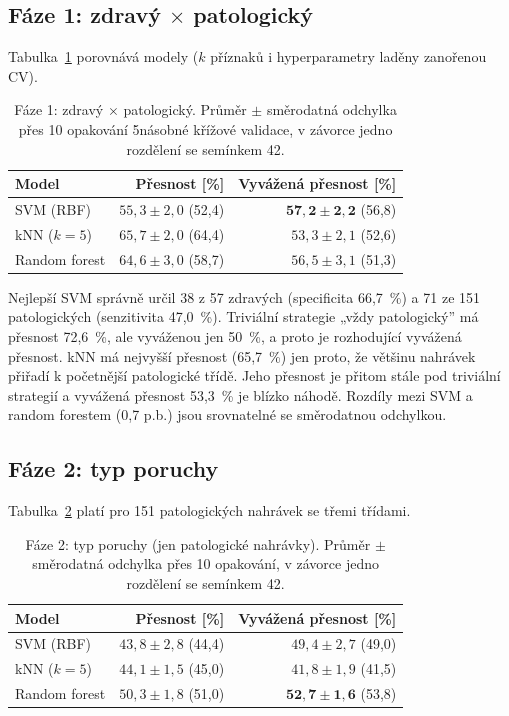 \documentclass[11pt,a4paper]{article}
\begin{document}
\subsection{Fáze 1: zdravý $\times$ patologický}
Tabulka~\ref{tab:faze1} porovnává modely ($k$ příznaků i hyperparametry laděny zanořenou CV).

\begin{table}[H]
\centering\small
\caption{Fáze 1: zdravý $\times$ patologický. Průměr $\pm$ směrodatná odchylka přes 10 opakování
5násobné křížové validace, v závorce jedno rozdělení se semínkem 42.}
\label{tab:faze1}
\begin{tabular}{lrr}
\toprule
Model & Přesnost [\%] & Vyvážená přesnost [\%]\\
\midrule
SVM (RBF)     & $55{,}3 \pm 2{,}0$ (52,4) & $\mathbf{57{,}2 \pm 2{,}2}$ (56,8)\\
kNN ($k=5$)   & $65{,}7 \pm 2{,}0$ (64,4) & $53{,}3 \pm 2{,}1$ (52,6)\\
Random forest & $64{,}6 \pm 3{,}0$ (58,7) & $56{,}5 \pm 3{,}1$ (51,3)\\
\bottomrule
\end{tabular}
\end{table}

Nejlepší SVM správně určil 38 z 57 zdravých (specificita 66,7~\%) a 71 ze 151 patologických
(senzitivita 47,0~\%). Triviální strategie „vždy patologický” má přesnost 72,6~\%, ale vyváženou
jen 50~\%, a proto je rozhodující vyvážená přesnost. kNN má nejvyšší přesnost (65,7~\%) jen proto,
že většinu nahrávek přiřadí k početnější patologické třídě. Jeho přesnost je přitom stále pod
triviální strategií a vyvážená přesnost 53,3~\% je blízko náhodě. Rozdíly mezi SVM a random
forestem (0,7 p.b.) jsou srovnatelné se směrodatnou odchylkou.

\subsection{Fáze 2: typ poruchy}
Tabulka~\ref{tab:faze2} platí pro 151 patologických nahrávek se třemi třídami.

\begin{table}[H]
\centering\small
\caption{Fáze 2: typ poruchy (jen patologické nahrávky). Průměr $\pm$ směrodatná odchylka přes
10 opakování, v závorce jedno rozdělení se semínkem 42.}
\label{tab:faze2}
\begin{tabular}{lrr}
\toprule
Model & Přesnost [\%] & Vyvážená přesnost [\%]\\
\midrule
SVM (RBF)     & $43{,}8 \pm 2{,}8$ (44,4) & $49{,}4 \pm 2{,}7$ (49,0)\\
kNN ($k=5$)   & $44{,}1 \pm 1{,}5$ (45,0) & $41{,}8 \pm 1{,}9$ (41,5)\\
Random forest & $50{,}3 \pm 1{,}8$ (51,0) & $\mathbf{52{,}7 \pm 1{,}6}$ (53,8)\\
\bottomrule
\end{tabular}
\end{table}
\end{document}
